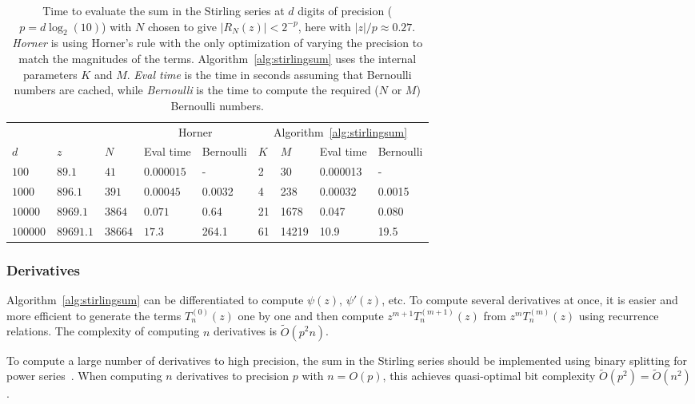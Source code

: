 \documentclass[reqno]{amsart}
\newcommand{\bigOtilde}{\widetilde O}
\theoremstyle{definition}
\begin{document}
\begin{table}[h!]
\setlength{\tabcolsep}{3pt}
\renewcommand{\arraystretch}{1.1}
\centering
\caption{Time to evaluate the sum in the Stirling series at $d$ digits of precision
($p = d \log_2(10)$) with $N$ chosen to give $|R_N(z)| < 2^{-p}$, here with
$|z| / p \approx 0.27$.
\emph{Horner} is using Horner's rule with the only optimization of
varying the precision to match the magnitudes of the terms.
Algorithm~\ref{alg:stirlingsum} uses the internal parameters $K$ and $M$.
\emph{Eval time} is the time in seconds assuming that Bernoulli numbers are cached,
while \emph{Bernoulli} is the time to compute the required ($N$ or $M$) Bernoulli numbers.}
\label{table:stirlingalgbench}
\small
\begin{tabular}{l l l | l l | l l l l}
    &     &  &  \multicolumn{2}{|c|}{Horner} & \multicolumn{4}{c}{Algorithm~\ref{alg:stirlingsum}} \\
$d$ & $z$ & $N$ & Eval time & Bernoulli & $K$ & $M$ & Eval time & Bernoulli \\
\hline
$100$ & $89.1$ & $41$ & $0.000015$ & - & 2 & 30 & 0.000013 & - \\
$1000$ & $896.1$ & $391$ & $0.00045$ & 0.0032 & 4 & 238 & 0.00032 & 0.0015 \\
$10000$ & $8969.1$ & $3864$ & $0.071$ & 0.64 & 21 & 1678 & 0.047 & 0.080 \\
$100000$ & $89691.1$ & $38664$ & $17.3$ & 264.1 & 61 & 14219 & 10.9 & 19.5 \\
\end{tabular}
\end{table}

\subsubsection{Derivatives}

Algorithm~\ref{alg:stirlingsum} can be differentiated to compute $\psi(z)$,
$\psi'(z)$, etc.
To compute several derivatives at once, it is easier and
more efficient to generate
the terms $T_n^{(0)}(z)$ one by one
and then compute $z^{m+1} T_n^{(m+1)}(z)$ from $z^m T_n^{(m)}(z)$ using recurrence relations.
The complexity of computing $n$ derivatives is $\bigOtilde(p^2 n)$.

To compute a large number of derivatives to high precision,
the sum in the Stirling series should be implemented
using binary splitting for power series~\cite[Algorithm 4.6.1]{Johansson2014thesis}.
When computing $n$ derivatives to precision $p$ with $n = O(p)$,
this achieves quasi-optimal bit complexity $\bigOtilde(p^2) = \bigOtilde(n^2)$.
\end{document}
